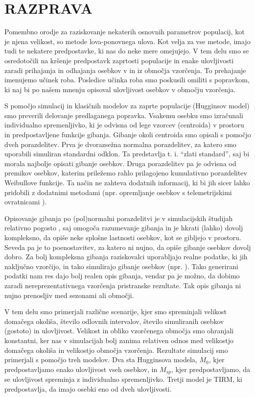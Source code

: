 \section{RAZPRAVA}
Pomembno orodje za raziskovanje nekaterih osnovnih parametrov populacij, kot je njena velikost, so metode lova-ponovnega ulova. Kot velja za vse metode, imajo tudi te nekatere predpostavke, ki nas do neke mere omejujejo. V tem delu smo se osredotočili na kršenje predpostavk zaprtosti populacije in enake ulovljivosti zaradi prihajanja in odhajanja osebkov v in iz območja vzorčenja. To prehajanje imenujemo učinek roba. Posledice učinka roba smo poskusili omiliti s popravkom, ki naj bi po našem mnenju opisoval ulovljivost osebkov v območju vzorčenja.

S pomočjo simulacij in klasičnih modelov za zaprte populacije (Hugginsov model) smo preverili delovanje predlaganega popravka. Vsakemu osebku smo izračunali individualno spremenljivko, ki je odvisna od lege vzorcev (centroida) v prostoru in predpostavljene funkcije gibanja. Gibanje okoli centroida smo opisali s pomočjo dveh porazdelitev. Prva je dvorazsežna normalna porazdelitev, za katero smo uporabili simuliran standardni odklon. Ta predstavlja t. i. ``zlati standard'', saj bi morala najbolje opisati gibanje osebkov. Druga porazdelitev pa je odvisna od premikov osebkov, katerim priležemo rahlo prilagojeno kumulativno porazdelitev Weibullove funkcije. Ta način ne zahteva dodatnih informacij, ki bi jih sicer lahko pridobili z dodatnimi metodami (npr. opremljanje osebkov s telemetrijskimi ovratnicami \citep{ivan-et-al-2013-aux}).

Opisovanje gibanja po (pol)normalni porazdelitvi je v simulacijskih študijah relativno pogosto \citep{bolker_ecological_2008, ivan_using_2013}, saj omogoča razumevanje gibanja in je hkrati (lahko) dovolj kompleksno, da opiše neke splošne lastnosti osebkov, kot se gibljejo v prostoru. Seveda pa je to poenostavitev, za katero ni nujno, da opiše gibanje osebkov dovolj dobro. Za bolj kompleksna gibanja raziskovalci uporabljajo realne podatke, ki jih naključno vzorčijo, in tako simulirajo gibanje osebkov (npr. \citealp{manning_estimating_2010}). Tako generirani podatki nam res dajo bolj realen opis gibanja, vendar pa je možno, da dobimo zaradi nereprezentativnega vzorčenja pristranske rezultate. Tak opis gibanja ni nujno prenosljiv med sezonami ali območji.

V tem delu smo primerjali različne scenarije, kjer smo spreminjali velikost domačega okoliša, število odlovnih intervalov, število simuliranih osebkov (gostoto) in ulovljivost. Velikost in obliko vzorčenega območja smo ohranjali konstantni, ker nas v simulacijah bolj zanima relativen odnos med velikostjo domačega okoliša in velikostjo območja vzorčenja. Rezultate simulacij smo primerjali s pomočjo treh modelov. Dva sta Hugginsova modela, $M_0$, kjer predpostavljamo enako ulovljivost vseh osebkov, in $M_{sp}$, kjer predpostavljamo, da se ulovljivost spreminja z individualno spremenljivko. Tretji model je TIRM, ki predpostavlja, da imajo osebki eno od dveh ulovljivosti.

